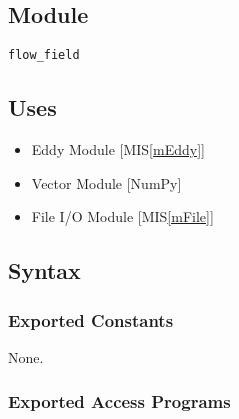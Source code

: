 \documentclass[12pt, titlepage]{article}
\begin{document}
\subsection{Module}
\texttt{flow\_field}

\subsection{Uses}
\begin{itemize}
\item Eddy Module [MIS\ref{mEddy}]
\item Vector Module [NumPy]
\item File I/O Module [MIS\ref{mFile}]
\end{itemize}

\subsection{Syntax}

\subsubsection{Exported Constants}
None.

\subsubsection{Exported Access Programs}
\end{document}
